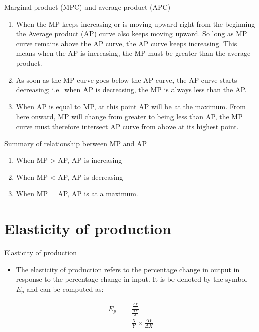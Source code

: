 \documentclass[12pt,ignorenonframetext,aspectratio=169]{beamer}
\providecommand{\tightlist}{%
  \setlength{\itemsep}{0pt}\setlength{\parskip}{0pt}}
\begin{document}
\begin{frame}{Marginal product (MPC) and average product (APC)}
\protect\hypertarget{marginal-product-mpc-and-average-product-apc}{}
\begin{enumerate}
\tightlist
\item
  When the MP keeps increasing or is moving upward right from the
  beginning the Average product (AP) curve also keeps moving upward. So
  long as MP curve remains above the AP curve, the AP curve keeps
  increasing. This means when the AP is increasing, the MP must be
  greater than the average product.
\item
  As soon as the MP curve goes below the AP curve, the AP curve starts
  decreasing; i.e.~when AP is decreasing, the MP is always less than the
  AP.
\item
  When AP is equal to MP, at this point AP will be at the maximum. From
  here onward, MP will change from greater to being less than AP, the MP
  curve must therefore intersect AP curve from above at its highest
  point.
\end{enumerate}
\end{frame}

\begin{frame}{Summary of relationship between MP and AP}
\protect\hypertarget{summary-of-relationship-between-mp-and-ap}{}
\begin{enumerate}
\tightlist
\item
  When MP \textgreater{} AP, AP is increasing
\item
  When MP \textless{} AP, AP is decreasing
\item
  When MP = AP, AP is at a maximum.
\end{enumerate}
\end{frame}

\hypertarget{elasticity-of-production}{%
\section{Elasticity of production}\label{elasticity-of-production}}

\begin{frame}{Elasticity of production}
\begin{itemize}
\tightlist
\item
  The elasticity of production refers to the percentage change in output
  in response to the percentage change in input. It is be denoted by the
  symbol \(E_p\) and can be computed as:
\end{itemize}

\[
\begin{aligned}
E_p &= \frac{\frac{\Delta Y}{Y}}{\frac{\Delta X}{X}} \\
&= \frac{X}{Y}\times {\frac{\Delta Y}{\Delta X}}
\end{aligned}
\]
\end{frame}
\end{document}
